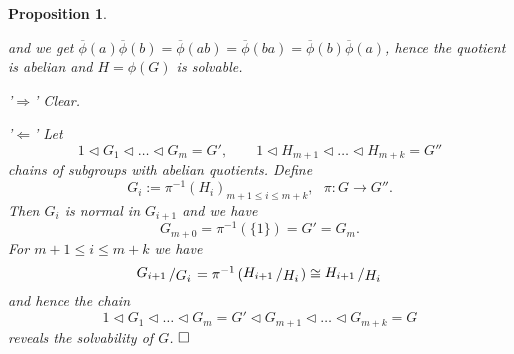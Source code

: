 \documentclass[11pt]{book}
\newtheorem{proposition}[theorem]{Proposition}
\theoremstyle{nonumberbreak}
\newenvironment{pr}[1][]{\ifthenelse{\equal{#1}{}}{\proof}{\proof[#1]}\rm}{\endproof}
\newcommand{\slant}[2]{{\raisebox{.1em}{$#1$}\left/\raisebox{-.1em}{$#2$}\right.}}
\begin{document}
\begin{spacing}{1.3}
\begin{proposition}
\begin{pr}
\begin{compactenum}
\begin{compactenum}
and we get $\overline{\phi}(a) \overline{\phi}(b)=\overline{\phi}(ab)=\overline{\phi}(ba)=\overline{\phi}(b) \overline{\phi}(a)$, hence the quotient is abelian and $H=\phi(G)$ is solvable.
\end{compactenum}
\item \begin{compactitem}
\item['$\Rightarrow$'] Clear.
\item['$\Leftarrow$'] Let $$1 \triangleleft G_1 \triangleleft \dots \triangleleft G_m =G', \qquad 1 \triangleleft H_{m+1} \triangleleft \dots \triangleleft H_{m+k}=G''$$ chains of subgroups with abelian quotients. Define $$G_i:= \pi^{-1} \left(H_i\right)_{m+1 \leqslant i \leqslant m+k}, \textrm{ } \pi:G \longrightarrow G''.$$
Then $G_i$ is normal in $G_{i+1}$ and we have 
\noindent
$$G_{m+0}=\pi^{-1}(\{1\})=G'=G_m.$$
\noindent
For $m+1 \leqslant i \leqslant m+k$ we have $$\slant{G_{i+1}}{G_i} = \pi^{-1}\left(\slant{H_{i+1}}{H_i}\right) \cong \slant{H_{i+1}}{H_i}$$ and hence the chain $$1 \triangleleft G_1 \triangleleft \dots \triangleleft G_m=G' \triangleleft G_{m+1} \triangleleft \dots \triangleleft G_{m+k}=G$$ reveals the solvability of $G$. $\hfill \Box$
\end{compactitem}
\end{compactenum}
\end{pr}
\end{proposition}


\end{spacing}
\end{document}
